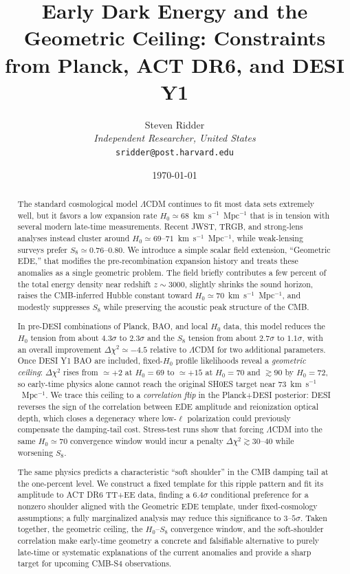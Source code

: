 \documentclass[a4paper,11pt]{article}
\title{Early Dark Energy and the Geometric Ceiling: Constraints from Planck, ACT DR6, and DESI Y1}
\author{Steven Ridder\\
\textit{Independent Researcher, United States}\\
\texttt{sridder@post.harvard.edu}}
\date{\today}
\begin{document}
\maketitle

\begin{abstract}
The standard cosmological model $\Lambda$CDM continues to fit most data sets extremely well, but it favors a low expansion rate $H_0 \simeq 68$~km~s$^{-1}$~Mpc$^{-1}$ that is in tension with several modern late-time measurements. Recent JWST, TRGB, and strong-lens analyses instead cluster around $H_0 \simeq 69$--$71$~km~s$^{-1}$~Mpc$^{-1}$, while weak-lensing surveys prefer $S_8 \simeq 0.76$--$0.80$. We introduce a simple scalar field extension, ``Geometric EDE,'' that modifies the pre-recombination expansion history and treats these anomalies as a single geometric problem. The field briefly contributes a few percent of the total energy density near redshift $z \sim 3000$, slightly shrinks the sound horizon, raises the CMB-inferred Hubble constant toward $H_0 \simeq 70$~km~s$^{-1}$~Mpc$^{-1}$, and modestly suppresses $S_8$ while preserving the acoustic peak structure of the CMB.

In pre-DESI combinations of Planck, BAO, and local $H_0$ data, this model reduces the $H_0$ tension from about $4.3\sigma$ to $2.3\sigma$ and the $S_8$ tension from about $2.7\sigma$ to $1.1\sigma$, with an overall improvement $\Delta\chi^2 \simeq -4.5$ relative to $\Lambda$CDM for two additional parameters. Once DESI Y1 BAO are included, fixed-$H_0$ profile likelihoods reveal a \emph{geometric ceiling}: $\Delta\chi^2$ rises from $\simeq +2$ at $H_0 = 69$ to $\simeq +15$ at $H_0 = 70$ and $\gtrsim 90$ by $H_0 = 72$, so early-time physics alone cannot reach the original SH0ES target near $73$~km~s$^{-1}$~Mpc$^{-1}$. We trace this ceiling to a \emph{correlation flip} in the Planck+DESI posterior: DESI reverses the sign of the correlation between EDE amplitude and reionization optical depth, which closes a degeneracy where low-$\ell$ polarization could previously compensate the damping-tail cost. Stress-test runs show that forcing $\Lambda$CDM into the same $H_0 \simeq 70$ convergence window would incur a penalty $\Delta\chi^2 \gtrsim 30$--$40$ while worsening $S_8$.

The same physics predicts a characteristic ``soft shoulder'' in the CMB damping tail at the one-percent level. We construct a fixed template for this ripple pattern and fit its amplitude to ACT DR6 TT+EE data, finding a $6.4\sigma$ conditional preference for a nonzero shoulder aligned with the Geometric EDE template, under fixed-cosmology assumptions; a fully marginalized analysis may reduce this significance to $3$--$5\sigma$. Taken together, the geometric ceiling, the $H_0$--$S_8$ convergence window, and the soft-shoulder correlation make early-time geometry a concrete and falsifiable alternative to purely late-time or systematic explanations of the current anomalies and provide a sharp target for upcoming CMB-S4 observations.
\end{abstract}
\end{document}
